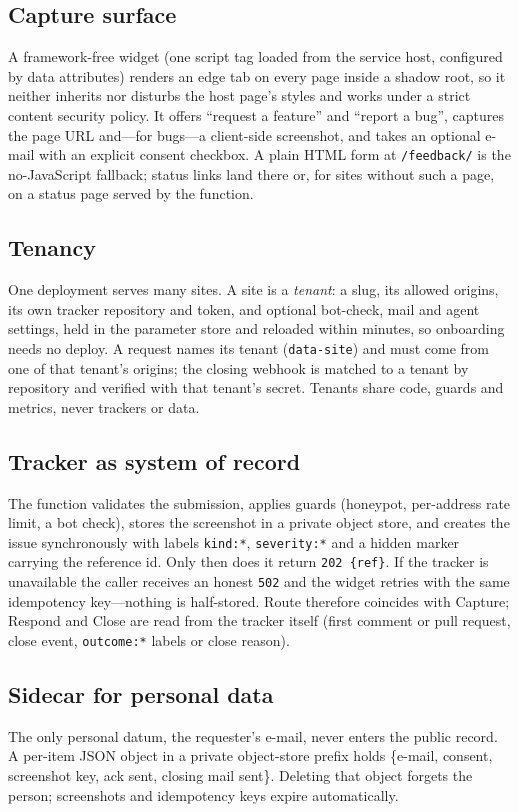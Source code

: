 \subsection{Capture surface}
A framework-free widget (one script tag loaded from the service host, configured by data attributes) renders an edge tab on every page inside a shadow root, so it neither inherits nor disturbs the host page's styles and works under a strict content security policy. It offers ``request a feature'' and ``report a bug'', captures the page URL and---for bugs---a client-side screenshot, and takes an optional e-mail with an explicit consent checkbox. A plain HTML form at \texttt{/feedback/} is the no-JavaScript fallback; status links land there or, for sites without such a page, on a status page served by the function.

\subsection{Tenancy}
One deployment serves many sites. A site is a \emph{tenant}: a slug, its allowed origins, its own tracker repository and token, and optional bot-check, mail and agent settings, held in the parameter store and reloaded within minutes, so onboarding needs no deploy. A request names its tenant (\texttt{data-site}) and must come from one of that tenant's origins; the closing webhook is matched to a tenant by repository and verified with that tenant's secret. Tenants share code, guards and metrics, never trackers or data.

\subsection{Tracker as system of record}
The function validates the submission, applies guards (honeypot, per-address rate limit, a bot check), stores the screenshot in a private object store, and creates the issue synchronously with labels \texttt{kind:*}, \texttt{severity:*} and a hidden marker carrying the reference id. Only then does it return \texttt{202 \{ref\}}. If the tracker is unavailable the caller receives an honest \texttt{502} and the widget retries with the same idempotency key---nothing is half-stored. Route therefore coincides with Capture; Respond and Close are read from the tracker itself (first comment or pull request, close event, \texttt{outcome:*} labels or close reason).

\subsection{Sidecar for personal data}
The only personal datum, the requester's e-mail, never enters the public record. A per-item JSON object in a private object-store prefix holds \{e-mail, consent, screenshot key, ack sent, closing mail sent\}. Deleting that object forgets the person; screenshots and idempotency keys expire automatically.

